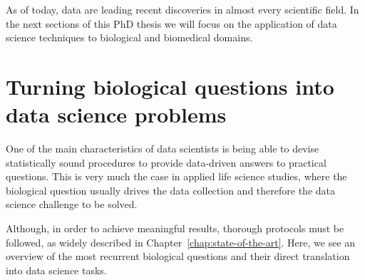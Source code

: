 As of today, data are leading recent discoveries in almost every scientific field. In the next sections of this PhD thesis we will focus on the application of data science techniques to biological and biomedical domains.







%
%

\section{Turning biological questions into data science problems} \label{sec:clinical_to_data}
One of the main characteristics of data scientists is being able to devise statistically sound procedures to provide data-driven answers to practical questions. This is very much the case in applied life science studies, where the biological question usually drives the data collection and therefore the data science challenge to be solved.

Although, in order to achieve meaningful results, thorough protocols must be followed, as widely described in Chapter~\ref{chap:state-of-the-art}.
Here, we see an overview of the most recurrent biological questions and their direct translation into data science tasks.

